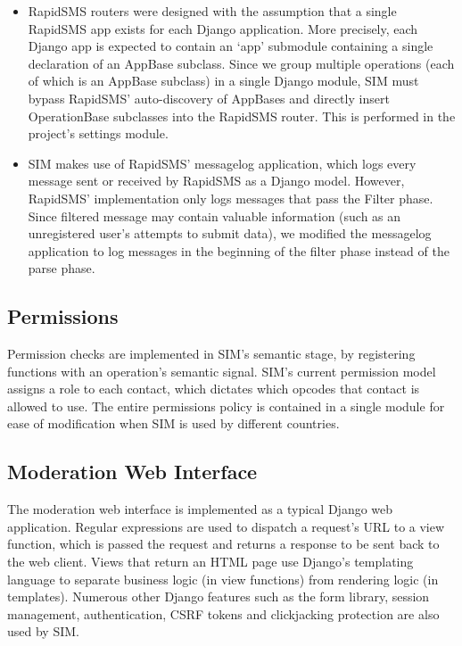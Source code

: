 \documentclass{acm_proc_article-sp}
\begin{document}
\begin{itemize}
\item RapidSMS routers were designed with the assumption that a single RapidSMS app exists for each Django application. More precisely, each Django app is expected to contain an ‘app' submodule containing a single declaration of an AppBase subclass. Since we group multiple operations (each of which is an AppBase subclass) in a single Django module, SIM must bypass RapidSMS' auto-discovery of AppBases and directly insert OperationBase subclasses into the RapidSMS router. This is performed in the project's settings module.
\item SIM makes use of RapidSMS' messagelog application, which logs every message sent or received by RapidSMS as a Django model. However, RapidSMS' implementation only logs messages that pass the Filter phase. Since filtered message may contain valuable information (such as an unregistered user's attempts to submit data), we modified the messagelog application to log messages in the beginning of the filter phase instead of the parse phase.
\end{itemize}

\subsection{Permissions}

Permission checks are implemented in SIM's semantic stage, by registering functions with an operation's semantic signal. SIM's current permission model assigns a role to each contact, which dictates which opcodes that contact is allowed to use. The entire permissions policy is contained in a single module for ease of modification when SIM is used by different countries.

\subsection{Moderation Web Interface}

The moderation web interface is implemented as a typical Django web application. Regular expressions are used to dispatch a request's URL to a view function, which is passed the request and returns a response to be sent back to the web client. Views that return an HTML page use Django's templating language to separate business logic (in view functions) from rendering logic (in templates). Numerous other Django features such as the form library, session management, authentication, CSRF tokens and clickjacking protection are also used by SIM.
\end{document}

